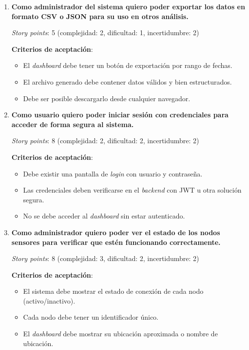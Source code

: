 \documentclass[
11pt, %
]{charter}
\begin{document}
\begin{enumerate}
    \item \textbf{Como administrador del sistema quiero poder exportar los datos en formato CSV o JSON para su uso en otros análisis.}

    \textit{Story points}: 5 (complejidad: 2, dificultad: 1, incertidumbre: 2)

    \textbf{Criterios de aceptación}:
    \begin{itemize}
        \item El \textit{dashboard} debe tener un botón de exportación por rango de fechas.
        \item El archivo generado debe contener datos válidos y bien estructurados.
        \item Debe ser posible descargarlo desde cualquier navegador.
    \end{itemize}

    \item \textbf{Como usuario quiero poder iniciar sesión con credenciales para acceder de forma segura al sistema.}

    \textit{Story points}: 8 (complejidad: 2, dificultad: 2, incertidumbre: 2)

    \textbf{Criterios de aceptación}:
    \begin{itemize}
        \item Debe existir una pantalla de \textit{login} con usuario y contraseña.
        \item Las credenciales deben verificarse en el \textit{backend} con JWT u otra solución segura.
        \item No se debe acceder al \textit{dashboard} sin estar autenticado.
    \end{itemize}

    \item \textbf{Como administrador quiero poder ver el estado de los nodos sensores para verificar que estén funcionando correctamente.}

    \textit{Story points}: 8 (complejidad: 3, dificultad: 2, incertidumbre: 2)

    \textbf{Criterios de aceptación}:
    \begin{itemize}
        \item El sistema debe mostrar el estado de conexión de cada nodo (activo/inactivo).
        \item Cada nodo debe tener un identificador único.
        \item El \textit{dashboard} debe mostrar su ubicación aproximada o nombre de ubicación.
    \end{itemize}


\end{enumerate}
\end{document}
